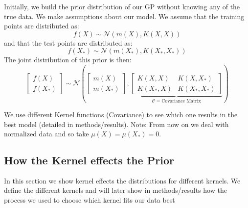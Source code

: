 \documentclass{article}
\begin{document}
Initially, we build the prior distribution of our GP without knowing any of the true data. We make assumptions about our model. We assume that the training points are distributed as:
\[
f(X) \sim \mathcal{N}(m(X), K(X, X))
\]
\noindent
and that the test points are distributed as:
\[
f(X_*) \sim \mathcal{N}(m(X_*), K(X_*, X_*))
\]
\noindent
The joint distribution of this prior is then:
\[
\begin{bmatrix}
f(X) \\
f(X_*)
\end{bmatrix}
\sim \mathcal{N} \left(
\begin{bmatrix}
m(X) \\
m(X_*)
\end{bmatrix},
\underbrace{
\begin{bmatrix}
K(X, X) & K(X, X_*) \\
K(X_*, X) & K(X_*, X_*)
\end{bmatrix}
}_{\mathcal{C} = \text{Covariance Matrix}}
\right)
\]
\noindent

\noindent
We use different Kernel functions (Covariance) to see which one results in the best model (detailed in methods/results).
Note: From now on we deal with normalized data and so take $\mu(X) = \mu(X_*) = 0$.

\subsection{How the Kernel effects the Prior}

In this section we show kernel effects the distributions for different kernels. We define the different kernels and will later show in methods/results how the process we used to choose which kernel fits our data best

\end{document}
